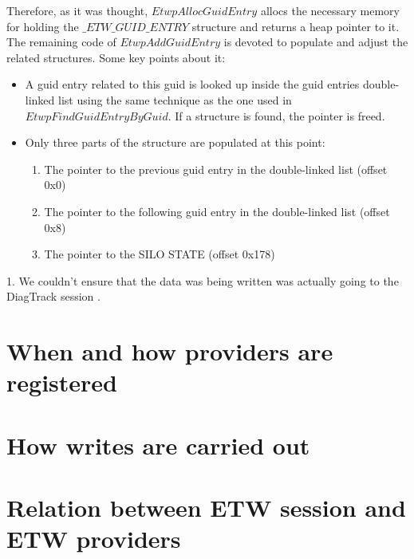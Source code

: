 Therefore, as it was thought, $EtwpAllocGuidEntry$ allocs the necessary memory for holding the $\_ETW\_GUID\_ENTRY$ structure and returns a heap pointer to it. 
The remaining code of $EtwpAddGuidEntry$ is devoted to populate and adjust the related structures. Some key points about it: 
\begin{itemize}
\item A guid entry related to this guid is looked up inside the guid entries double-linked list using the same technique as the one used in $EtwpFindGuidEntryByGuid$. If a structure is found, the pointer is freed.
\item Only three parts of the structure are populated at this point:
  \begin{enumerate}
  \item The pointer to the previous guid entry in the double-linked list (offset 0x0)
  \item The pointer to the following guid entry in the double-linked list (offset 0x8)
  \item The pointer to the SILO STATE (offset 0x178)
  \end{enumerate}
\end{itemize}



























\newpage
{\huge 1. We couldn't ensure that the data was being written was actually going to the DiagTrack session .}

\section{When and how providers are registered}
\section{How writes are carried out}
\section{Relation between ETW session and ETW providers}
